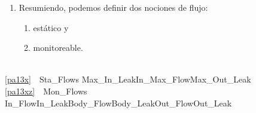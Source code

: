 \mnewfoil\HHHH
\begin{enumerate}\setei
\item \label{pa13xy} Resumiendo, podemos definir dos nociones de flujo:
\begin{enumerate}
\item \label{pa13x} estático y
\item \label{pa13xz} monitoreable.
\savei\end{enumerate}
\savei\end{enumerate}\footnotesize\small\LLLL
\bp
{}\\
\ref{pa13x}\ \ Sta\_Flows {\EQ} Max\_In\_Leak{\TIMES}In\_Max\_Flow{\GT}Max\_Out\_Leak\\
\ref{pa13xz}\ \ Mon\_Flows {\EQ} In\_Flow{\TIMES}In\_Leak{\TIMES}Body\_Flow{\TIMES}Body\_Leak{\TIMES}Out\_Flow{\TIMES}Out\_Leak
\ep
\normalsize
\mnewfoil





